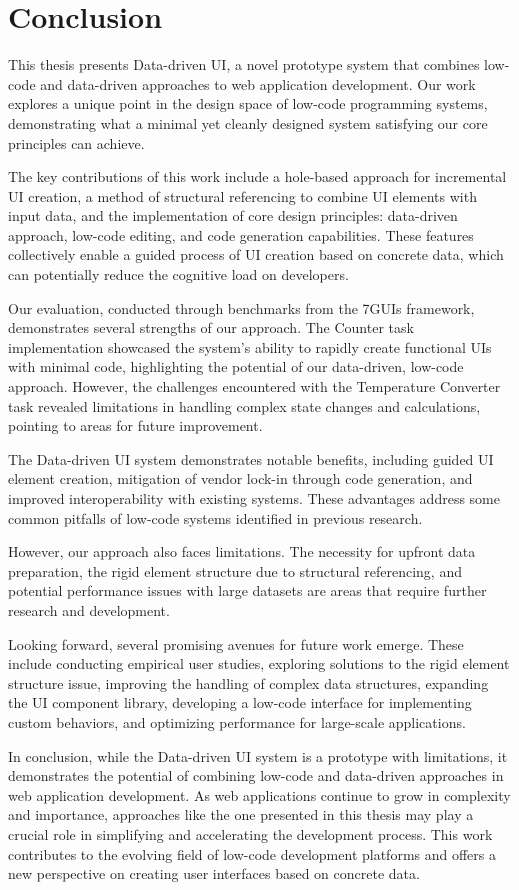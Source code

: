 \chapter*{Conclusion}


This thesis presents Data-driven UI, a novel prototype system that combines low-code and data-driven approaches to web application development. Our work explores a unique point in the design space of low-code programming systems, demonstrating what a minimal yet cleanly designed system satisfying our core principles can achieve.

The key contributions of this work include a hole-based approach for incremental UI creation, a method of structural referencing to combine UI elements with input data, and the implementation of core design principles: data-driven approach, low-code editing, and code generation capabilities. These features collectively enable a guided process of UI creation based on concrete data, which can potentially reduce the cognitive load on developers.

Our evaluation, conducted through benchmarks from the 7GUIs framework, demonstrates several strengths of our approach. The Counter task implementation showcased the system's ability to rapidly create functional UIs with minimal code, highlighting the potential of our data-driven, low-code approach. However, the challenges encountered with the Temperature Converter task revealed limitations in handling complex state changes and calculations, pointing to areas for future improvement.

The Data-driven UI system demonstrates notable benefits, including guided UI element creation, mitigation of vendor lock-in through code generation, and improved interoperability with existing systems. These advantages address some common pitfalls of low-code systems identified in previous research.

However, our approach also faces limitations. The necessity for upfront data preparation, the rigid element structure due to structural referencing, and potential performance issues with large datasets are areas that require further research and development.

Looking forward, several promising avenues for future work emerge. These include conducting empirical user studies, exploring solutions to the rigid element structure issue, improving the handling of complex data structures, expanding the UI component library, developing a low-code interface for implementing custom behaviors, and optimizing performance for large-scale applications.

In conclusion, while the Data-driven UI system is a prototype with limitations, it demonstrates the potential of combining low-code and data-driven approaches in web application development. As web applications continue to grow in complexity and importance, approaches like the one presented in this thesis may play a crucial role in simplifying and accelerating the development process. This work contributes to the evolving field of low-code development platforms and offers a new perspective on creating user interfaces based on concrete data.

